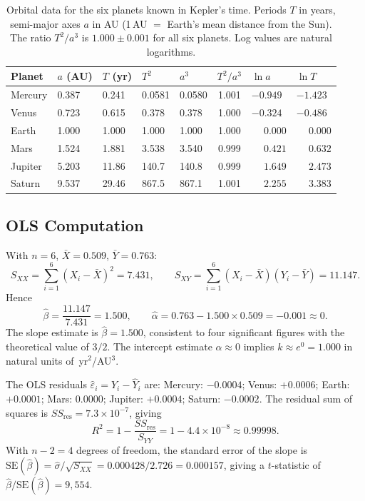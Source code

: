\documentclass[12pt]{article}
\begin{document}
\begin{table}[h]
\centering
\renewcommand{\arraystretch}{1.25}
\caption{Orbital data for the six planets known in Kepler's time.
  Periods $T$ in years, semi-major axes $a$ in AU (1\,AU $=$ Earth's
  mean distance from the Sun).  The ratio $T^{2}/a^{3}$ is
  $1.000 \pm 0.001$ for all six planets.
  Log values are natural logarithms.}
\label{tab:harmonic}
\begin{tabular}{@{}lp{1.3cm}p{1.3cm}p{1.3cm}p{1.3cm}cp{1.3cm}p{1.3cm}@{}}
\toprule
Planet & $a$ (AU) & $T$ (yr) & $T^{2}$ & $a^{3}$ & $T^{2}/a^{3}$
  & $\ln a$ & $\ln T$ \\
\midrule
Mercury & 0.387 & 0.241 & 0.0581 & 0.0580 & 1.001 & $-0.949$ & $-1.423$ \\
Venus   & 0.723 & 0.615 & 0.378  & 0.378  & 1.000 & $-0.324$ & $-0.486$ \\
Earth   & 1.000 & 1.000 & 1.000  & 1.000  & 1.000 & $\phantom{-}0.000$ & $\phantom{-}0.000$ \\
Mars    & 1.524 & 1.881 & 3.538  & 3.540  & 0.999 & $\phantom{-}0.421$ & $\phantom{-}0.632$ \\
Jupiter & 5.203 & 11.86 & 140.7  & 140.8  & 0.999 & $\phantom{-}1.649$ & $\phantom{-}2.473$ \\
Saturn  & 9.537 & 29.46 & 867.5  & 867.1  & 1.001 & $\phantom{-}2.255$ & $\phantom{-}3.383$ \\
\bottomrule
\end{tabular}
\end{table}

\subsection{OLS Computation}

With $n=6$, $\bar X = 0.509$, $\bar Y = 0.763$:
\[
  S_{XX}
  = \sum_{i=1}^{6}(X_{i}-\bar X)^{2}
  = 7.431,
  \qquad
  S_{XY}
  = \sum_{i=1}^{6}(X_{i}-\bar X)(Y_{i}-\bar Y)
  = 11.147.
\]
Hence
\[
  \hat\beta = \frac{11.147}{7.431} = 1.500,
  \qquad
  \hat\alpha = 0.763 - 1.500\times0.509 = -0.001 \approx 0.
\]
The slope estimate is $\hat\beta=1.500$, consistent to four significant
figures with the theoretical value of $3/2$.
The intercept estimate $\hat\alpha\approx0$ implies $k\approx e^{0}=1.000$
in natural units of~yr$^{2}$/AU$^{3}$.

The OLS residuals $\hat\varepsilon_{i}=Y_{i}-\hat Y_{i}$ are:
Mercury: $-0.0004$; Venus: $+0.0006$; Earth: $+0.0001$;
Mars: $0.0000$; Jupiter: $+0.0004$; Saturn: $-0.0002$.
The residual sum of squares is
$SS_{\text{res}}=7.3\times10^{-7}$, giving
\[
  R^{2} = 1 - \frac{SS_{\text{res}}}{S_{YY}} = 1 - 4.4\times10^{-8} \approx 0.99998.
\]
With $n-2=4$ degrees of freedom,
the standard error of the slope is
$\text{SE}(\hat\beta) = \hat\sigma/\sqrt{S_{XX}}
= 0.000428/2.726 = 0.000157$,
giving a $t$-statistic of $\hat\beta/\text{SE}(\hat\beta)=9{,}554$.
\end{document}
